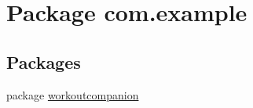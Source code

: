 \hypertarget{namespacecom_1_1example}{\section{Package com.\-example}
\label{namespacecom_1_1example}
}
\subsection*{Packages}
\begin{DoxyCompactItemize}
\item 
package \hyperlink{namespacecom_1_1example_1_1workoutcompanion}{workoutcompanion}
\end{DoxyCompactItemize}
